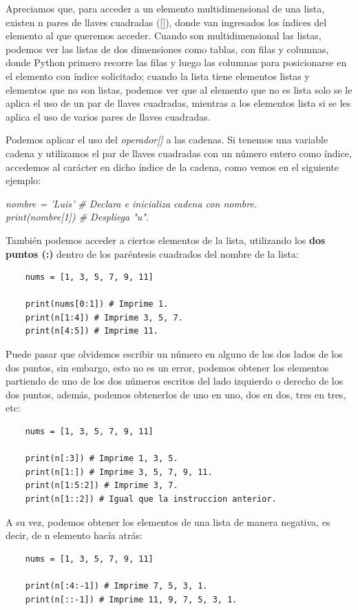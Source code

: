 Apreciamos que, para acceder a un elemento multidimensional de una lista, existen n pares de llaves cuadradas ([]), donde van ingresados los índices del elemento al que queremos acceder. Cuando son multidimensional las listas, podemos ver las listas de dos dimensiones como tablas, con filas y columnas, donde Python primero recorre las filas y luego las columnas para posicionarse en el elemento con índice solicitado; cuando la lista tiene elementos listas y elementos que no son listas, podemos ver que al elemento que no es lista solo se le aplica el uso de un par de llaves cuadradas, mientras a los elementos lista si se les aplica el uso de varios pares de llaves cuadradas.

Podemos aplicar el uso del \textit{operador[]} a las cadenas. Si tenemos una variable cadena y utilizamos el par de llaves cuadradas con un número entero como índice, accedemos al carácter en dicho índice de la cadena, como vemos en el siguiente ejemplo:
\begin{center}
	\textit{
		nombre = 'Luis' \# Declara e inicializa cadena con nombre. \\
		print(nombre[1]) \# Despliega "u".
	}
\end{center}

También podemos acceder a ciertos elementos de la lista, utilizando los \textbf{dos puntos (:)} dentro de los paréntesis cuadrados del nombre de la lista:
\begin{lstlisting}
	nums = [1, 3, 5, 7, 9, 11]
	
	print(nums[0:1]) # Imprime 1.
	print(n[1:4]) # Imprime 3, 5, 7.
	print(n[4:5]) # Imprime 11.
\end{lstlisting}

Puede pasar que olvidemos escribir un número en alguno de los dos lados de los dos puntos, sin embargo, esto no es un error, podemos obtener los elementos partiendo de uno de los dos números escritos del lado izquierdo o derecho de los dos puntos, además, podemos obtenerlos de uno en uno, dos en dos, tres en tres, etc:
\begin{lstlisting}
	nums = [1, 3, 5, 7, 9, 11]
	
	print(n[:3]) # Imprime 1, 3, 5.
	print(n[1:]) # Imprime 3, 5, 7, 9, 11.
	print(n[1:5:2]) # Imprime 3, 7.
	print(n[1::2]) # Igual que la instruccion anterior.
\end{lstlisting}

A su vez, podemos obtener los elementos de una lista de manera negativa, es decir, de n elemento hacía atrás:
\begin{lstlisting}
	nums = [1, 3, 5, 7, 9, 11]
	
	print(n[:4:-1]) # Imprime 7, 5, 3, 1.
	print(n[::-1]) # Imprime 11, 9, 7, 5, 3, 1.
\end{lstlisting}



